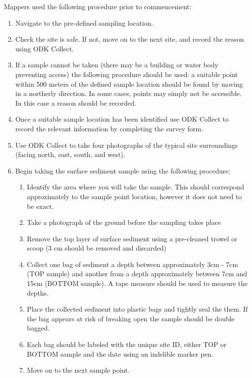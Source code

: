 \documentclass[a4paper,12pt,twoside]{article}
\begin{document}
\color{RHgrey}
Mappers used the following procedure prior to commencement:
\begin{enumerate}
\item Navigate to the pre-defined sampling location.
\item Check the site is safe. If not, move on to the next site, and record the reason using ODK Collect.
\item If a sample cannot be taken (there may be a building or water body preventing access) the following procedure should be used: a suitable point within 500 meters of the defined sample location should be found by moving in a northerly direction. In some cases, points may simply not be accessible. In this case a reason should be recorded.
\item Once a suitable sample location has been identified use ODK Collect to record the relevant information by completing the survey form.
\item Use ODK Collect to take four photographs of the typical site surroundings (facing north, east, south, and west).
\item Begin taking the surface sediment sample using the following procedure:
\begin{enumerate}
\item Identify the area where you will take the sample. This should correspond
approximately to the sample point location, however it does not need to be exact.
\item Take a photograph of the ground before the sampling takes place
\item Remove the top layer of surface sediment using a pre-cleaned trowel or scoop (3 cm should be removed and discarded)
\item Collect one bag of sediment a depth between approximately 3cm - 7cm (TOP sample) and another from a depth approximately between 7cm and 15cm (BOTTOM sample). A tape measure should be used to measure the depths.
\item Place the collected sediment into plastic bags and tightly seal the them. If the bag appears at risk of breaking open the sample should be double bagged.
\item Each bag should be labeled with the unique site ID, either TOP or BOTTOM sample and the date using an indelible marker pen.
\item Move on to the next sample point.
\end{enumerate}
\end{enumerate}
\end{document}
